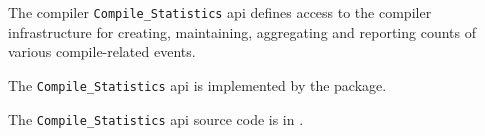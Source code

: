 
The compiler {\tt Compile\_Statistics} api defines access to the compiler infrastructure 
for creating, maintaining, aggregating and reporting counts of various compile-related 
events.

The {\tt Compile\_Statistics} api is implemented by the  package.

The {\tt Compile\_Statistics} api source code is in .





